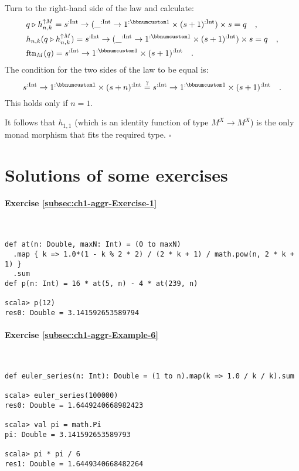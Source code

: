 Turn to the right-hand side of the law and calculate:
\begin{align*}
 & q\triangleright h_{n,k}^{\uparrow M}=s^{:\text{Int}}\rightarrow(\_^{:\text{Int}}\rightarrow1^{:\bbnum 1}\times(s+1)^{:\text{Int}})\times s=q\quad,\\
 & h_{n,k}(q\triangleright h_{n,k}^{\uparrow M})=s^{:\text{Int}}\rightarrow(\_^{:\text{Int}}\rightarrow1^{:\bbnum 1}\times(s+1)^{:\text{Int}})\times s=q\quad,\\
 & \text{ftn}_{M}(q)=s^{:\text{Int}}\rightarrow1^{:\bbnum 1}\times(s+1)^{:\text{Int}}\quad.
\end{align*}
The condition for the two sides of the law to be equal is:
\[
s^{:\text{Int}}\rightarrow1^{:\bbnum 1}\times(s+n)^{:\text{Int}}\overset{?}{=}s^{:\text{Int}}\rightarrow1^{:\bbnum 1}\times(s+1)^{:\text{Int}}\quad.
\]
This holds only if $n=1$.

It follows that $h_{1,1}$ (which is an identity function of type
$M^{X}\rightarrow M^{X}$) is the only monad morphism that fits the
required type. $\square$

\chapter{Solutions of some exercises}


\subsubsection*{Exercise \ref{subsec:ch1-aggr-Exercise-1}}

~
\begin{lstlisting}
def at(n: Double, maxN: Int) = (0 to maxN)
  .map { k => 1.0*(1 - k % 2 * 2) / (2 * k + 1) / math.pow(n, 2 * k + 1) }
  .sum
def p(n: Int) = 16 * at(5, n) - 4 * at(239, n)

scala> p(12)
res0: Double = 3.141592653589794
\end{lstlisting}


\subsubsection*{Exercise \ref{subsec:ch1-aggr-Example-6}}

~

\begin{lstlisting}
def euler_series(n: Int): Double = (1 to n).map(k => 1.0 / k / k).sum

scala> euler_series(100000)
res0: Double = 1.6449240668982423

scala> val pi = math.Pi
pi: Double = 3.141592653589793

scala> pi * pi / 6
res1: Double = 1.6449340668482264 
\end{lstlisting}


